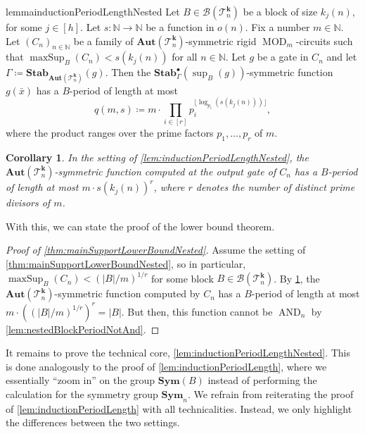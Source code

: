 \documentclass[11pt]{article}
\DeclareMathOperator{\supp}{sup}
\DeclareMathOperator{\MOD}{MOD}
\DeclareMathOperator{\AND}{AND}
\DeclareMathOperator{\maxSup}{maxSup}
\newcommand{\Aut}{\mathbf{Aut}}
\newcommand{\Sym}{\mathbf{Sym}}
\newcommand{\Stab}{\mathbf{Stab}}
\newcommand{\StabP}{\mathbf{Stab}^{\bullet}}
\newcommand{\bbN}{\mathbb{N}}
\newcommand{\Bb}{{\mathcal B}}
\newcommand{\Tt}{{\mathcal T}}
\theoremstyle{definition}
\theoremstyle{plain}
\newtheorem{corollary}[definition]{Corollary}
\theoremstyle{remark}
\theoremstyle{remark}
\newcommand{\maxsup}{\operatorname{maxSup}}
\begin{document}
\begin{restatable}{lemma}{inductionPeriodLengthNested}
	\label{lem:inductionPeriodLengthNested}
	Let $B \in \Bb(\Tt_n^{\boldsymbol{k}})$ be a block of size $k_j(n)$, for some $j\in [h]$. Let $s \colon \bbN \to \bbN$ be a function in $o(n)$. Fix a number $m \in \bbN$.
	Let $(C_n)_{n \in \bbN}$ be a family of $\Aut(\Tt_n^{\boldsymbol{k}})$-symmetric rigid $\MOD_m$-circuits such that $\maxsup_{B}(C_n) < s(k_j(n))$ for all $n \in \bbN$.
	Let $g$ be a gate in $C_n$ and let $\Gamma \coloneqq  \Stab_{\Aut(\Tt_n^{\boldsymbol{k}})}(g)$. Then the $\StabP_\Gamma(\supp_{B}(g))$-symmetric function $g(\bar{x})$ has a $B$-period of length at most 
	\[
	q(m,s) \coloneqq m \cdot \prod_{i \in [r]} p_i^{\lfloor \log_{p_i}(s(k_j(n))) \rfloor},
	\]
	where the product ranges over the prime factors $p_1, \dots, p_r$ of $m$.
\end{restatable}


\begin{corollary}
	\label{cor:upperboundPeriodLengthNested}
	In the setting of \cref{lem:inductionPeriodLengthNested}, the $\Aut(\Tt_n^{\boldsymbol{k}})$-symmetric function computed at the output gate of $C_n$ has a $B$-period of length at most $m \cdot s(k_j(n))^r$, where $r$ denotes the number of distinct prime divisors of $m$.
\end{corollary}


With this, we can state the proof of the lower bound theorem.
\begin{proof}[Proof of \cref{thm:mainSupportLowerBoundNested}]
	Assume the setting of \cref{thm:mainSupportLowerBoundNested}, so in particular, $\maxSup_{B}(C_n) < (|B|/m)^{1/r}$ for some block $B \in \Bb(\Tt_n^{\boldsymbol{k}})$. 
	By \cref{cor:upperboundPeriodLengthNested}, the $\Aut(\Tt_n^{\boldsymbol{k}})$-symmetric function computed by $C_n$ has a $B$-period of length at most $m \cdot ((|B|/m)^{1/r})^r = |B|$. But then, this function cannot be $\AND_n$ by \cref{lem:nestedBlockPeriodNotAnd}.
\end{proof}	

It remains to prove the technical core, \cref{lem:inductionPeriodLengthNested}.
This is done analogously to the proof of \cref{lem:inductionPeriodLength}, where we essentially ``zoom in'' on the group $\Sym(B)$ instead of performing the calculation for the symmetry group $\Sym_n$. 
We refrain from reiterating the proof of \cref{lem:inductionPeriodLength} with all technicalities. Instead, we only highlight the differences between the two settings.
\end{document}
